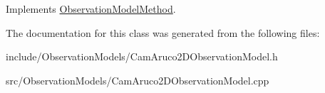 \-Implements \hyperlink{class_observation_model_method_af1a30aad975576ae8f16042a8ee8276b}{\-Observation\-Model\-Method}.



\-The documentation for this class was generated from the following files\-:\begin{DoxyCompactItemize}
\item 
include/\-Observation\-Models/\-Cam\-Aruco2\-D\-Observation\-Model.\-h\item 
src/\-Observation\-Models/\-Cam\-Aruco2\-D\-Observation\-Model.\-cpp\end{DoxyCompactItemize}
